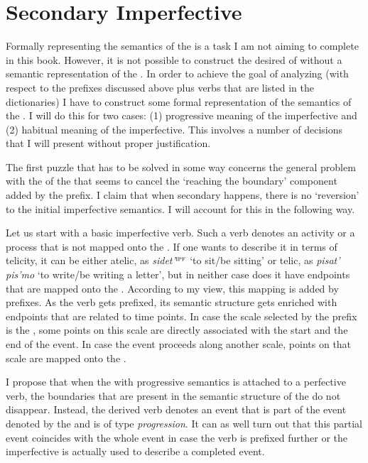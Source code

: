 \section{Secondary Imperfective}\label{section:imperfective}
Formally representing the semantics of the  is a task I am not aiming to complete in this book. However, it is not possible to construct the desired  of  without a semantic representation of the . In order to achieve the goal of analyzing  (with respect to the prefixes discussed above plus verbs that are listed in the dictionaries) I have to construct some formal representation of the semantics of the . I will do this for two cases: (1) progressive meaning of the imperfective and (2) habitual meaning of the imperfective. This involves a number of decisions that I will present without proper justification.

The first puzzle that has to be solved in some way concerns the general problem with the  of the  that seems to cancel the `reaching the boundary' component added by the prefix. I claim that when secondary  happens, there is no `reversion' to the initial imperfective semantics. I will account for this in the following way. 

Let us start with a basic imperfective verb. Such a verb denotes an activity or a process that is not mapped onto the . If one wants to describe it in terms of telicity, it can be either atelic, as \textit{sidet'}$^{\textsc{ipf}}$ `to sit/be sitting' or telic, as \textit{pisat' pis'mo} `to write/be writing a letter', but in neither case does it have endpoints that are mapped onto the . According to my view, this mapping is added by prefixes. As the verb gets prefixed, its semantic structure gets enriched with endpoints that are related to time points. In case the scale selected by the prefix is the , some points on this scale are directly associated with the start and the end of the event. In case the event proceeds along another scale, points on that scale are mapped onto the . 

I propose that when the  with progressive semantics is attached to a perfective verb, the boundaries that are present in the semantic structure of the  do not disappear. Instead, the derived verb denotes an event that is part of the event denoted by the  and is of type \textit{progression}. It can as well turn out that this partial event coincides with the whole event in case the verb is prefixed further or the imperfective is actually used to describe a completed event.

